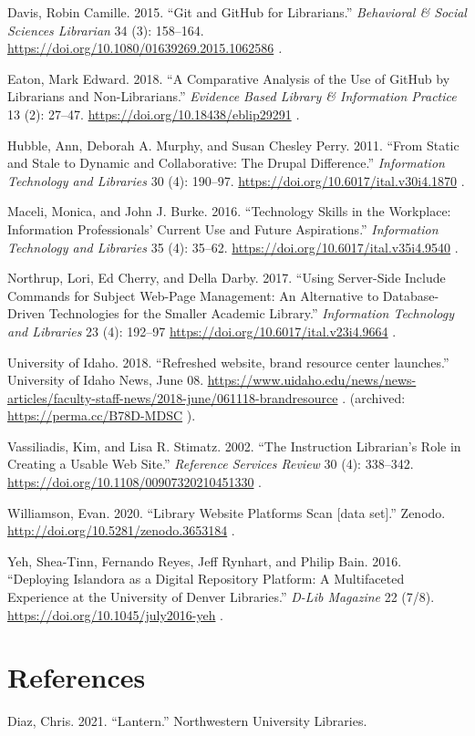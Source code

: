 \documentclass{book}
\newlength{\cslhangindent}
\newlength{\cslentryspacingunit} %
\newenvironment{CSLReferences}[2] %
 {%
  \setlength{\parindent}{0pt}
  \ifodd #1
  \let\oldpar\par
  \def\par{\hangindent=\cslhangindent\oldpar}
  \fi
  \setlength{\parskip}{#2\cslentryspacingunit}
 }%
 {}
\begin{document}
Davis, Robin Camille. 2015. ``Git and GitHub for Librarians.''
\emph{Behavioral \& Social Sciences Librarian} 34 (3): 158--164.
\url{https://doi.org/10.1080/01639269.2015.1062586} \emph{.}

Eaton, Mark Edward. 2018. ``A Comparative Analysis of the Use of GitHub by
Librarians and Non-Librarians.'' \emph{Evidence Based Library \& Information
Practice} 13 (2): 27--47. \url{https://doi.org/10.18438/eblip29291} \emph{.}

Hubble, Ann, Deborah A. Murphy, and Susan Chesley Perry. 2011. ``From Static
and Stale to Dynamic and Collaborative: The Drupal Difference.''
\emph{Information Technology and Libraries }30 (4): 190--97.
\url{https://doi.org/10.6017/ital.v30i4.1870} .

Maceli, Monica, and John J. Burke. 2016. ``Technology Skills in the Workplace:
Information Professionals' Current Use and Future Aspirations.''
\emph{Information Technology and Libraries} 35 (4): 35--62.
\url{https://doi.org/10.6017/ital.v35i4.9540} .

Northrup, Lori, Ed Cherry, and Della Darby. 2017. ``Using Server-Side Include
Commands for Subject Web-Page Management: An Alternative to Database-Driven
Technologies for the Smaller Academic Library.'' \emph{Information Technology
and Libraries} 23 (4): 192--97 \url{https://doi.org/10.6017/ital.v23i4.9664} .

University of Idaho. 2018. ``Refreshed website, brand resource center
launches.'' University of Idaho News, June 08.
\url{https://www.uidaho.edu/news/news-articles/faculty-staff-news/2018-june/061118-brandresource}
. (archived: \url{https://perma.cc/B78D-MDSC} ).

Vassiliadis, Kim, and Lisa R. Stimatz. 2002. ``The Instruction Librarian's
Role in Creating a Usable Web Site.'' \emph{Reference Services Review} 30 (4):
338--342. \url{https://doi.org/10.1108/00907320210451330} .

Williamson, Evan. 2020. ``Library Website Platforms Scan {[}data set{]}.''
Zenodo. \url{http://doi.org/10.5281/zenodo.3653184} .

Yeh, Shea-Tinn, Fernando Reyes, Jeff Rynhart, and Philip Bain. 2016.
``Deploying Islandora as a Digital Repository Platform: A Multifaceted
Experience at the University of Denver Libraries.'' \emph{D-Lib Magazine} 22
(7/8). \url{https://doi.org/10.1045/july2016-yeh} .

\hypertarget{bibliography}{%
\chapter*{References}\label{bibliography}}

\hypertarget{refs}{}
\begin{CSLReferences}{1}{0}
\leavevmode{}%
Diaz, Chris. 2021. {``Lantern.''} Northwestern University Libraries.

\end{CSLReferences}

\backmatter
\end{document}
